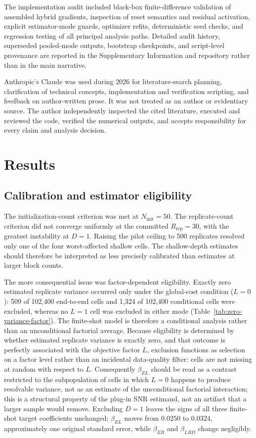 \documentclass[pdflatex,sn-basic,Numbered]{sn-jnl}
\begin{document}
The implementation audit included black-box finite-difference validation of assembled hybrid gradients, inspection of reset semantics and residual activation, explicit estimator-mode guards, optimizer refits, deterministic seed checks, and regression testing of all principal analysis paths. Detailed audit history, superseded pooled-mode outputs, bootstrap checkpoints, and script-level provenance are reported in the Supplementary Information and repository rather than in the main narrative.

Anthropic's Claude was used during 2026 for literature-search planning, clarification of technical concepts, implementation and verification scripting, and feedback on author-written prose. It was not treated as an author or evidentiary source. The author independently inspected the cited literature, executed and reviewed the code, verified the numerical outputs, and accepts responsibility for every claim and analysis decision.

\section{Results}

\subsection{Calibration and estimator eligibility}\label{sec:results-calibration}\label{sec:zero-variance-sensitivity}

The initialization-count criterion was met at $N_{\mathrm{init}}=50$. The replicate-count criterion did not converge uniformly at the committed $R_{\mathrm{rep}}=30$, with the greatest instability at $D=1$. Raising the pilot ceiling to 500 replicates resolved only one of the four worst-affected shallow cells. The shallow-depth estimates should therefore be interpreted as less precisely calibrated than estimates at larger block counts.

The more consequential issue was factor-dependent eligibility. Exactly zero estimated replicate variance occurred only under the global-cost condition ($L=0$): 509 of 102,400 end-to-end cells and 1,324 of 102,400 conditional cells were excluded, whereas no $L=1$ cell was excluded in either mode (Table~\ref{tab:zero-variance-factor}). The finite-shot model is therefore a conditional analysis rather than an unconditional factorial average. Because eligibility is determined by whether estimated replicate variance is exactly zero, and that outcome is perfectly associated with the objective factor $L$, exclusion functions as selection on a factor level rather than an incidental data-quality filter: cells are not missing at random with respect to $L$. Consequently $\beta_{EL}$ should be read as a contrast restricted to the subpopulation of cells in which $L=0$ happens to produce resolvable variance, not as an estimate of the unconditional factorial interaction; this is a structural property of the plug-in SNR estimand, not an artifact that a larger sample would remove. Excluding $D=1$ leaves the signs of all three finite-shot target coefficients unchanged; $\beta_{EL}$ moves from $0.0250$ to $0.0324$, approximately one original standard error, while $\beta_{ER}$ and $\beta_{LRD}$ change negligibly.
\end{document}
